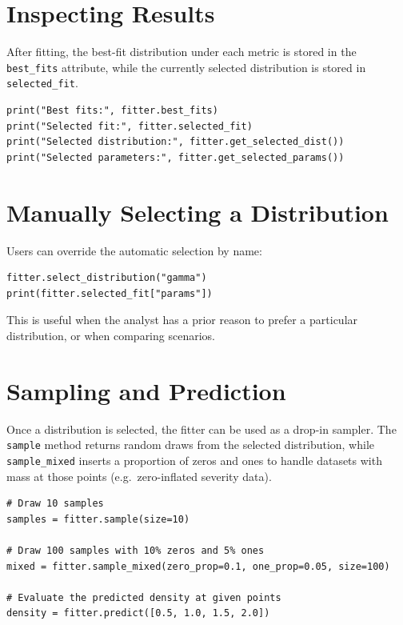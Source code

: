 \section{Inspecting Results}

After fitting, the best-fit distribution under each metric is stored in
the \texttt{best\_fits} attribute, while the currently selected
distribution is stored in \texttt{selected\_fit}.

\begin{lstlisting}[style=pythonstyle]
print("Best fits:", fitter.best_fits)
print("Selected fit:", fitter.selected_fit)
print("Selected distribution:", fitter.get_selected_dist())
print("Selected parameters:", fitter.get_selected_params())
\end{lstlisting}

\section{Manually Selecting a Distribution}

Users can override the automatic selection by name:

\begin{lstlisting}[style=pythonstyle]
fitter.select_distribution("gamma")
print(fitter.selected_fit["params"])
\end{lstlisting}

This is useful when the analyst has a prior reason to prefer a particular
distribution, or when comparing scenarios.

\section{Sampling and Prediction}

Once a distribution is selected, the fitter can be used as a drop-in
sampler. The \texttt{sample} method returns random draws from the
selected distribution, while \texttt{sample\_mixed} inserts a proportion
of zeros and ones to handle datasets with mass at those points (e.g.\
zero-inflated severity data).

\begin{lstlisting}[style=pythonstyle]
# Draw 10 samples
samples = fitter.sample(size=10)

# Draw 100 samples with 10% zeros and 5% ones
mixed = fitter.sample_mixed(zero_prop=0.1, one_prop=0.05, size=100)

# Evaluate the predicted density at given points
density = fitter.predict([0.5, 1.0, 1.5, 2.0])
\end{lstlisting}

